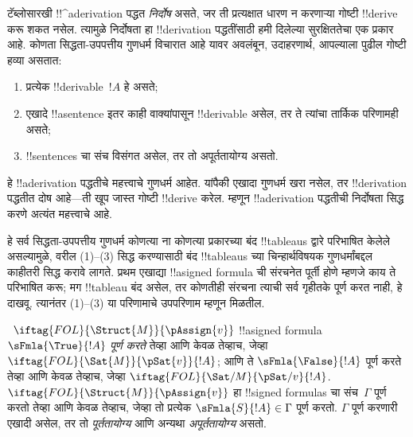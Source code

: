 \documentclass[../../../include/open-logic-section]{subfiles}
\begin{document}
      {}
      {}
      

\begin{explain}
टॅब्लोसारखी !!^a{derivation} पद्धत \emph{निर्दोष} असते, जर ती प्रत्यक्षात
धारण न करणाऱ्या गोष्टी !!{derive} करू शकत नसेल. त्यामुळे निर्दोषता हा
!!{derivation} पद्धतींसाठी हमी दिलेल्या सुरक्षिततेचा एक प्रकार आहे. कोणता
सिद्धता-उपपत्तीय गुणधर्म विचारात आहे यावर अवलंबून, उदाहरणार्थ, आपल्याला
पुढील गोष्टी हव्या असतात:
\begin{enumerate}
\item प्रत्येक !!{derivable}~$!A$ हे  असते;
\item एखादे !!a{sentence} इतर काही वाक्यांपासून !!{derivable} असेल, तर ते
  त्यांचा तार्किक परिणामही असते;
\item !!{sentence}s चा संच विसंगत असेल, तर तो अपूर्ततायोग्य असतो.
\end{enumerate}
हे !!a{derivation} पद्धतीचे महत्त्वाचे गुणधर्म आहेत. यांपैकी एखादा गुणधर्म
खरा नसेल, तर !!{derivation} पद्धतीत दोष आहे---ती खूप जास्त गोष्टी
!!{derive} करेल. म्हणून !!a{derivation} पद्धतीची निर्दोषता सिद्ध करणे अत्यंत
महत्त्वाचे आहे.

हे सर्व सिद्धता-उपपत्तीय गुणधर्म कोणत्या ना कोणत्या प्रकारच्या बंद
!!{tableau}s द्वारे परिभाषित केलेले असल्यामुळे, वरील (1)--(3) सिद्ध करण्यासाठी
बंद !!{tableau}s च्या चिन्हार्थविषयक गुणधर्मांबद्दल काहीतरी सिद्ध करावे लागते.
प्रथम एखाद्या !!a{signed
  formula} ची संरचनेत पूर्ती होणे म्हणजे काय ते
परिभाषित करू; मग !!{tableau} बंद असेल, तर कोणतीही संरचना त्याची सर्व गृहीतके
पूर्ण करत नाही, हे दाखवू. त्यानंतर (1)--(3) या परिणामाचे उपपरिणाम म्हणून
मिळतील.
\end{explain}

\begin{defn}
~$\iftag{FOL}{\Struct{M}}{\pAssign{v}}$
!!a{signed formula} $\sFmla{\True}{!A}$ \emph{पूर्ण करते} तेव्हा आणि केवळ तेव्हाच, जेव्हा
$\iftag{FOL}{\Sat{M}}{\pSat{v}}{!A}$; आणि ते
$\sFmla{\False}{!A}$ पूर्ण करते तेव्हा आणि केवळ तेव्हाच, जेव्हा
$\iftag{FOL}{\Sat/{M}}{\pSat/{v}}{!A}$. $\iftag{FOL}{\Struct{M}}{\pAssign{v}}$
हा !!{signed formula}s चा संच~$\Gamma$ पूर्ण करतो तेव्हा आणि केवळ तेव्हाच,
जेव्हा तो प्रत्येक $\sFmla{S}{!A} \in \Gamma$ पूर्ण करतो. $\Gamma$ पूर्ण
करणारी एखादी  असेल, तर तो
\emph{पूर्ततायोग्य} आणि अन्यथा \emph{अपूर्ततायोग्य} असतो.
\end{defn}
\end{document}
